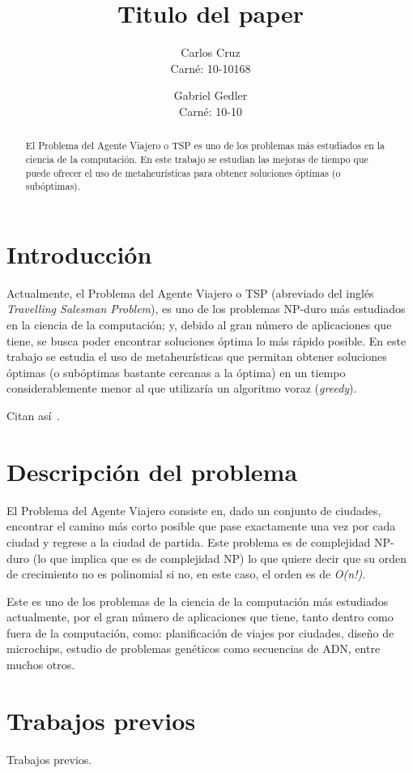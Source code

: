 \documentclass{ci5652}
\title{Titulo del paper}
\author{Carlos Cruz\\
Carné: 10-10168
        \and
        Gabriel Gedler\\
Carné: 10-10}
\begin{document}
\thispagestyle{empty}
\maketitle


\begin{abstract}
El Problema del Agente Viajero o TSP es uno de los problemas más estudiados en la ciencia de la computación. En este trabajo se estudian las mejoras de tiempo que puede ofrecer el uso de metaheurísticas para obtener soluciones óptimas (o subóptimas).
\end{abstract}

\section{Introducción}
Actualmente, el Problema del Agente Viajero o TSP (abreviado del inglés \textit{Travelling Salesman Problem}), es uno de los problemas NP-duro más estudiados en la ciencia de la computación; y, debido al gran número de aplicaciones que tiene, se busca poder encontrar soluciones óptima lo más rápido posible. 
En este trabajo se estudia el uso de metaheurísticas que permitan obtener soluciones óptimas (o subóptimas bastante cercanas a la óptima) en un tiempo considerablemente menor al que utilizaría un algoritmo voraz (\textit{greedy}).

Citan así~\cite{so2005}.

\section{Descripción del problema}
El Problema del Agente Viajero consiste en, dado un conjunto de ciudades, encontrar el camino más corto posible que pase exactamente una vez por cada ciudad y regrese a la ciudad de partida. Este problema es de complejidad NP-duro (lo que implica que es de complejidad NP) lo que quiere decir que su orden de crecimiento no es polinomial si no, en este caso, el orden es de \textit{O(n!)}.

Este es uno de los problemas de la ciencia de la computación más estudiados actualmente, por el gran número de aplicaciones que tiene, tanto dentro como fuera de la computación, como: planificación de viajes por ciudades, diseño de microchips, estudio de problemas genéticos como secuencias de ADN, entre muchos otros.


\section{Trabajos previos}
Trabajos previos.
\end{document}
